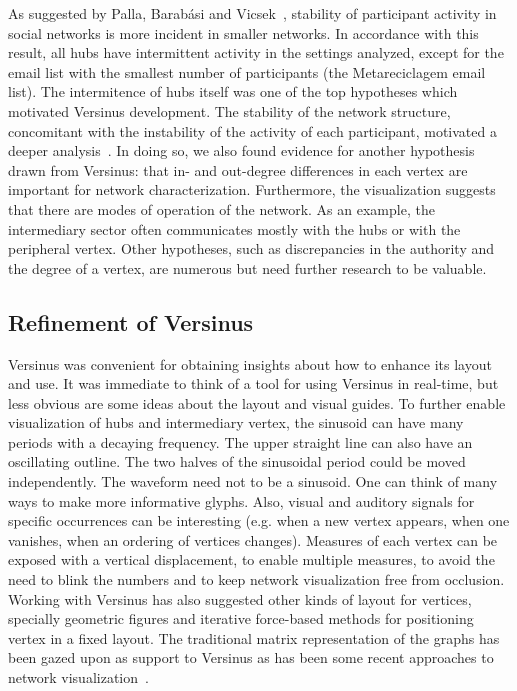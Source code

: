 As suggested by Palla, Barab\'asi and Vicsek~\cite{barabasiEvo}, stability of participant activity in social networks is more incident in smaller networks.
In accordance with this result, all hubs have intermittent activity in the settings analyzed, except for the email list with the smallest number of participants (the Metareciclagem email list).
The intermitence of hubs itself was one of the top hypotheses which motivated Versinus development.
The stability of the network structure, concomitant with the instability of the activity of each participant,
motivated a deeper analysis~\cite{evoSN}.
In doing so, we also found evidence for another hypothesis drawn from Versinus:
that in- and out-degree differences in each vertex are important for network characterization.
Furthermore, the visualization suggests that there are modes of operation of the network.
As an example, the intermediary sector often communicates mostly with the hubs or with the peripheral vertex.
Other hypotheses,
such as discrepancies in the authority and the degree of a vertex,
are numerous but need further research to be valuable.
 
\subsection{Refinement of Versinus}\label{sec:verref}
Versinus was convenient for obtaining insights about how to enhance its layout and use.
It was immediate to think of a tool for using Versinus
in real-time, but less obvious are some ideas about the layout and visual guides. 
To further enable visualization of hubs and intermediary vertex,
the sinusoid can have many periods 
with a decaying frequency.
The upper straight line can also have an oscillating outline.
The two halves of the sinusoidal period could be moved independently.
The waveform need not to be a sinusoid.
One can think of many ways to make more informative glyphs.
Also, visual and auditory signals for specific occurrences can be interesting
(e.g. when a new vertex appears, when one vanishes, when an ordering of vertices changes).
Measures of each vertex can be exposed with a vertical displacement,
to enable multiple measures, to avoid the need to blink the numbers and to keep network visualization free from occlusion.
Working with Versinus has also suggested other kinds of layout for vertices, 
specially geometric figures and iterative force-based methods for positioning vertex in a fixed layout.
The traditional matrix representation of the graphs has been gazed upon as support to Versinus 
as has been some recent approaches to network visualization~\cite{Viz1}.


